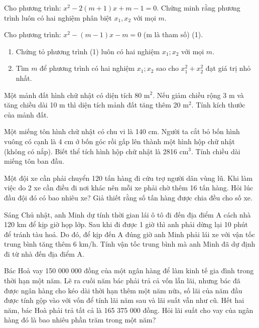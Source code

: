 \documentclass[%
    fontsize=12pt,%
    chapterprefix=false,%
    open=right,%
    twoside=false,%
    numbers=noenddot,%
    headings=optiontohead,%
    final,%
    DIV=15,%
    parskip=half %
]{scrbook}
\begin{document}
\begin{tuluan}
\item Cho phương trình: $ x^2 - 2(m+1)x + m-1 = 0 $. Chứng minh rằng phương trình luôn có hai nghiệm phân biệt $ x_1, x_2 $ với mọi $ m $.

\item Cho phương trình: $ x^2 - (m-1)x - m = 0 $ (m là tham số) (1).
\begin{enumerate}[label=\alph*)]
  \item[a)] Chứng tỏ phương trình (1) luôn có hai nghiệm $ x_1; x_2 $ với mọi $ m $.
  \item[b)] Tìm $ m $ để phương trình có hai nghiệm $ x_1; x_2 $ sao cho $ x_1^2 + x_2^2 $ đạt giá trị nhỏ nhất.
\end{enumerate}

\item Một mảnh đất hình chữ nhật có diện tích 80 m$^2$. Nếu giảm chiều rộng 3 m và tăng chiều dài 10 m thì diện tích mảnh đất tăng thêm 20 m$^2$. Tính kích thước của mảnh đất.

\item Một miếng tôn hình chữ nhật có chu vi là 140 cm. Người ta cắt bỏ bốn hình vuông có cạnh là 4 cm ở bốn góc rồi gấp lên thành một hình hộp chữ nhật (không có nắp). Biết thể tích hình hộp chữ nhật là 2816 cm$^3$. Tính chiều dài miếng tôn ban đầu.

\item Một đội xe cần phải chuyển 120 tấn hàng đi cứu trợ người dân vùng lũ. Khi làm việc do 2 xe cần điều đi nơi khác nên mỗi xe phải chờ thêm 16 tấn hàng. Hỏi lúc đầu đội đó có bao nhiêu xe? Giả thiết rằng số tấn hàng được chia đều cho số xe.

\item Sáng Chủ nhật, anh Minh dự tính thời gian lái ô tô đi đến địa điểm A cách nhà 120 km để kịp giờ họp lớp. Sau khi đi được 1 giờ thì anh phải dừng lại 10 phút để tránh tàu hoả. Do đó, để kịp đến A đúng giờ anh Minh phải lái xe với vận tốc trung bình tăng thêm 6 km/h. Tính vận tốc trung bình mà anh Minh đã dự định đi từ nhà đến địa điểm A.

\item Bác Hoà vay 150 000 000 đồng của một ngân hàng để làm kinh tế gia đình trong thời hạn một năm. Lẽ ra cuối năm bác phải trả cả vốn lẫn lãi, nhưng bác đã được ngân hàng cho kéo dài thời hạn thêm một năm nữa, số lãi của năm đầu được tính gộp vào với vốn để tính lãi năm sau và lãi suất vẫn như cũ. Hết hai năm, bác Hoà phải trả tất cả là 165 375 000 đồng. Hỏi lãi suất cho vay của ngân hàng đó là bao nhiêu phần trăm trong một năm?

\end{tuluan}
\end{document}
